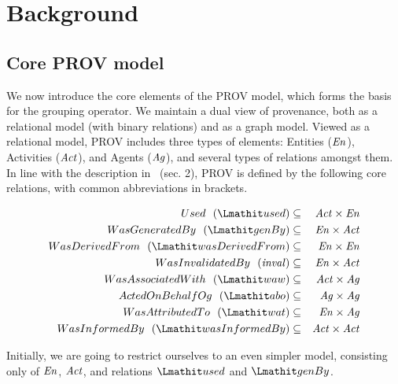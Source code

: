 
\section{Background}

\subsection{Core PROV model} \label{sec:prov-core}

We now introduce the core elements of the PROV model, which forms the basis for the grouping operator.
%
We maintain a dual view of provenance, both as a relational model (with binary relations) and as a graph model. Viewed as a relational model, PROV includes three types of elements: Entities ($\mathit{En}$), Activities ($\mathit{Act}$), and Agents ($\mathit{Ag}$), and several types of relations amongst them. 
In line with the description in~\citep{w3c-prov-dm} (sec. 2), PROV is defined by the following core relations, with common abbreviations in brackets. 

\begin{eqnarray*}
Used~~(\used)  & \subseteq & \act \times \en \\
WasGeneratedBy~~(\wgby) & \subseteq  & \en \times \act \\
WasDerivedFrom~~(\wdf) & \subseteq   & \en \times \en \\
WasInvalidatedBy~~(\inv) &  \subseteq &  \en \times \act \\
WasAssociatedWith~~(\waw) & \subseteq & \act \times \ag \\
ActedOnBehalfOg~~(\delegate) & \subseteq & \ag \times \ag \\ 
WasAttributedTo~~(\attrTo) & \subseteq & \en \times \ag \\
WasInformedBy~~(\wasInfBy) & \subseteq & \act \times \act
\end{eqnarray*}



%
Initially, we are going to restrict ourselves to an even simpler model, consisting only of $\mathit{En}$, $\mathit{Act}$, and relations $\used$ and $\wgby$.
%

